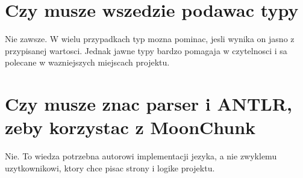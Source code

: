 \section{Czy musze wszedzie podawac typy}
Nie zawsze. W wielu przypadkach typ mozna pominac, jesli wynika on jasno z przypisanej
wartosci. Jednak jawne typy bardzo pomagaja w czytelnosci i sa polecane w wazniejszych
miejscach projektu.

\section{Czy musze znac parser i ANTLR, zeby korzystac z MoonChunk}
Nie. To wiedza potrzebna autorowi implementacji jezyka, a nie zwyklemu uzytkownikowi,
ktory chce pisac strony i logike projektu.
